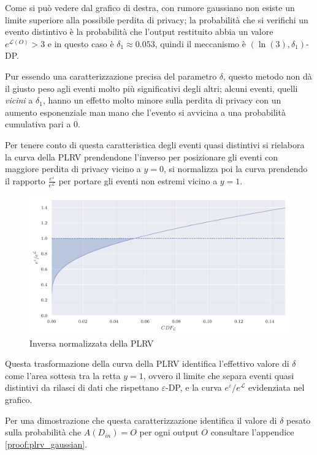 Come si può vedere dal grafico di destra, con rumore gaussiano non esiste un limite superiore alla possibile perdita di privacy; la probabilità che si verifichi un evento distintivo è la probabilità che l'output restituito abbia un valore $e^{\mathcal{L}(O)} > 3$ e in questo caso è $\delta_1 \approx 0.053$, quindi il meccanismo è $(\ln (3), \delta_1)$-DP.

Pur essendo una caratterizzazione precisa del parametro $\delta$, questo metodo non dà il giusto peso agli eventi molto più significativi degli altri; alcuni eventi, quelli \textit{vicini} a $\delta_1$, hanno un effetto molto minore sulla perdita di privacy con un aumento esponenziale man mano che l'evento si avvicina a una probabilità cumulativa pari a 0.

Per tenere conto di questa caratteristica degli eventi quasi distintivi si rielabora la curva della PLRV prendendone l'inverso per posizionare gli eventi con maggiore perdita di privacy vicino a $y = 0$, si normalizza poi la curva prendendo il rapporto $\frac{e^\varepsilon}{e^\mathcal{L}}$ per portare gli eventi non estremi vicino a $y = 1$.

\begin{figure}[H]
    \centering
    \includegraphics[width=.7\linewidth]{plots/normal_inverse_normalized_plrv.pdf}
    \caption{Inversa normalizzata della PLRV}
    \label{plot:normalized_inv_plrv}
\end{figure}

Questa trasformazione della curva della PLRV identifica l'effettivo valore di $\delta$ come l'area sottesa tra la retta $y = 1$, ovvero il limite che separa eventi quasi distintivi da rilasci di dati che rispettano $\varepsilon$-DP, e la curva $e^{\mathcal{\varepsilon}}/e^{\mathcal{L}}$ evidenziata nel grafico.

Per una dimostrazione che questa caratterizzazione identifica il valore di $\delta$ pesato sulla probabilità che $A(D_{in}) = O$ per ogni output $O$ consultare l'appendice \ref{proof:plrv_gaussian}.

